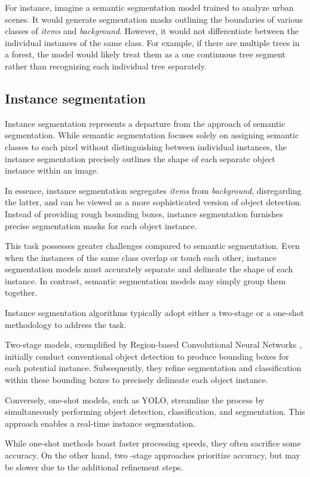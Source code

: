 For instance, imagine a semantic segmentation model trained to analyze urban scenes. It would generate segmentation
masks outlining the boundaries of various classes of \textit{items} and \textit{background}. However, it would not
differentiate between the individual instances of the same class. For example, if there are multiple trees in a
forest, the model would likely treat them as a one continuous tree segment rather than recognizing each individual tree
separately.

\subsection{Instance segmentation}
Instance segmentation represents a departure from the approach of semantic segmentation. While semantic segmentation
focuses solely on assigning semantic classes to each pixel without distinguishing between individual instances,
the instance segmentation precisely outlines the shape of each separate object instance within an image.

In essence, instance segmentation segregates \textit{items} from \textit{background}, disregarding the latter, and can be viewed as a more sophisticated version of object detection. Instead of providing rough bounding boxes, instance segmentation furnishes precise segmentation masks for each object instance.

This task possesses greater challenges compared to semantic segmentation. Even when the instances of the same class
overlap
or touch each other, instance segmentation models must accurately separate and delineate the shape of each instance. In contrast, semantic segmentation models may simply group them together.

Instance segmentation algorithms typically adopt either a two-stage or a one-shot methodology to address the task.

Two-stage models, exemplified by Region-based Convolutional Neural Networks \cite{RCNN2014}, initially conduct conventional object detection to produce bounding boxes for each potential instance. Subsequently, they refine segmentation and classification within these bounding boxes to precisely delineate each object instance.

Conversely, one-shot models, such as YOLO, streamline the process by simultaneously performing object detection,
classification, and segmentation. This approach enables a real-time instance segmentation.

While one-shot methods boast faster processing speeds, they often sacrifice some accuracy. On the other hand, two
-stage approaches prioritize accuracy, but may be slower due to the additional refinement steps.

